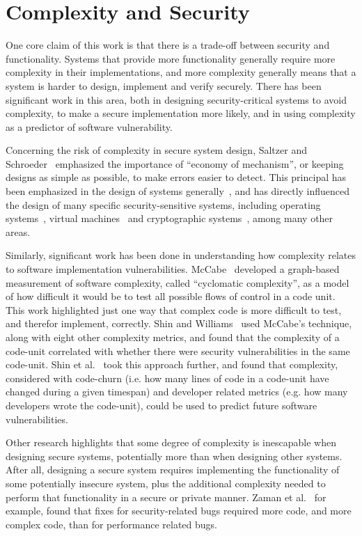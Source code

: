\section{Complexity and Security}
\label{background:complexity-vs-security}

One core claim of this work is that there is a trade-off between security and
functionality.  Systems that provide more functionality generally require
more complexity in their implementations, and more complexity generally means
that a system is harder to design, implement and verify securely.  There has
been significant work in this area, both in designing
security-critical systems to avoid complexity, to make
a secure implementation more likely, and in using complexity as a
predictor of software vulnerability.

Concerning the risk of complexity in secure system design, Saltzer and
Schroeder~\cite{saltzer1975protection} emphasized the importance of ``economy
of mechanism'', or keeping designs as simple as
possible, to make errors easier to detect.  This principal has been emphasized
in the design of systems generally~\cite{singaravelu2006reducing}, and
has directly influenced the design of many specific security-sensitive systems,
including operating systems~\cite{whitaker2002scale,klein2009sel4}, virtual
machines~\cite{payne2007secure} and cryptographic
systems~\cite{naylor2015multi}, among many other areas.

Similarly, significant work has been done in understanding how complexity
relates to software implementation vulnerabilities.
McCabe~\cite{mccabe1976complexity} developed a graph-based measurement of
software complexity, called ``cyclomatic complexity'', as a model of how
difficult it would be to test all possible flows of control in a code unit.
This work highlighted just one way that complex code is more difficult to
test, and therefor implement, correctly.  Shin and
Williams~\cite{shin2008empirical} used McCabe's technique,
along with eight other complexity metrics, and found that the complexity
of a code-unit correlated with whether there were security vulnerabilities
in the same code-unit.  Shin et al.~\cite{shin2011evaluating} took this
approach further, and found that complexity, considered with code-churn (i.e.
how many lines of code in a code-unit have changed during a given timespan) and
developer related metrics (e.g. how many developers wrote the code-unit),
could be used to predict future software vulnerabilities.

Other research highlights that some degree of complexity is inescapable
when designing secure systems, potentially more than when designing other
systems. After all, designing a secure system requires implementing the
functionality of some potentially insecure system, plus the additional complexity
needed to perform that functionality in a secure or private manner.
Zaman et al.~\cite{zaman2011security} for example, found that fixes for
security-related bugs required more code, and more complex code, than
for performance related bugs.

